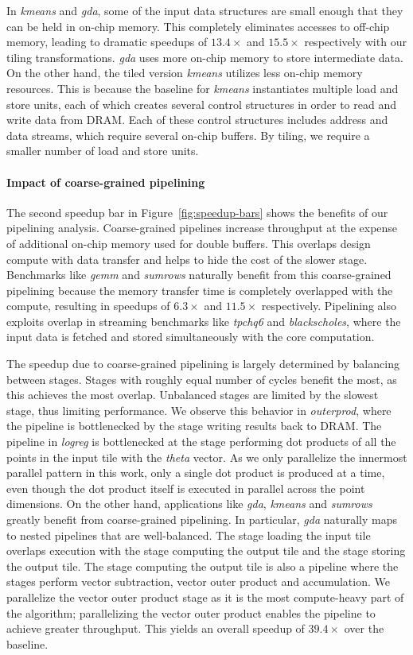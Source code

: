 In \emph{kmeans} and \emph{gda}, some
of the input data structures are small enough that they can be held in on-chip memory. This completely
eliminates accesses to off-chip memory, leading to dramatic speedups of $13.4\times$ and $15.5\times$ respectively
with our tiling transformations. \emph{gda} uses more on-chip memory to store intermediate data. On the other hand, the tiled
version \emph{kmeans} utilizes less on-chip memory resources. This is because the baseline for \emph{kmeans} instantiates multiple
load and store units, each of which creates several control structures in order to read and write data from DRAM. Each of these control
structures includes address and data streams, which require several on-chip buffers. By tiling, we require a smaller number of load and store units.

\paragraph{Impact of coarse-grained pipelining}
The second speedup bar in Figure~\ref{fig:speedup-bars} shows the benefits of our pipelining analysis.
Coarse-grained pipelines increase throughput
at the expense of additional on-chip memory used for double buffers.
This overlaps design compute with data transfer and helps to hide the cost of the slower stage. Benchmarks like
\emph{gemm} and \emph{sumrows} naturally benefit from this coarse-grained pipelining because the memory transfer time is completely overlapped
with the compute, resulting in speedups of $6.3\times$ and $11.5\times$ respectively.
Pipelining also exploits overlap in
streaming benchmarks like \emph{tpchq6} and \emph{blackscholes}, where the input data is fetched and stored simultaneously with the core computation.

The speedup due to coarse-grained pipelining is largely determined by balancing between stages. Stages with roughly equal number of cycles benefit
the most, as this achieves the most overlap. Unbalanced stages are limited by the slowest stage, thus limiting performance.
We observe this behavior in \emph{outerprod},
where the pipeline is bottlenecked by the stage writing results back to DRAM.
The pipeline in \emph{logreg} is bottlenecked
at the stage performing dot products of all the points in the input tile with the \emph{theta} vector. As we only parallelize the
innermost parallel pattern in this work, only a single dot product is produced at a time, even though the dot product itself
is executed in parallel across the point dimensions. On the other hand, applications
like \emph{gda}, \emph{kmeans} and \emph{sumrows} greatly benefit from coarse-grained pipelining.
In particular, \emph{gda} naturally
maps to nested pipelines that are well-balanced.
The stage loading the input tile overlaps execution with the stage
computing the output tile and the stage storing the output tile. The stage computing the output tile is also
a pipeline where the stages perform vector subtraction, vector outer product and accumulation. We parallelize the vector
outer product stage as it is the most compute-heavy part of the algorithm; parallelizing the vector outer product enables
the pipeline to achieve greater throughput. This yields an overall speedup of $39.4\times$
over the baseline.
